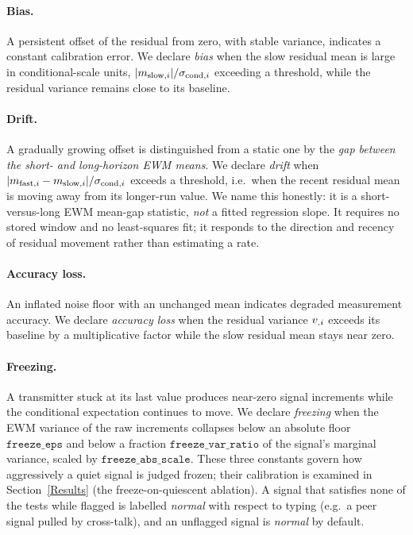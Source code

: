 \paragraph{Bias.} A persistent offset of the residual from zero, with stable variance, indicates a constant calibration error. We declare \emph{bias} when the slow residual mean is large in conditional-scale units, $|m _{\text{slow}, i}| / \sigma _{\text{cond}, i}$ exceeding a threshold, while the residual variance remains close to its baseline.

\paragraph{Drift.} A gradually growing offset is distinguished from a static one by the \emph{gap between the short- and long-horizon EWM means}. We declare \emph{drift} when $|m _{\text{fast}, i} - m _{\text{slow}, i}| / \sigma _{\text{cond}, i}$ exceeds a threshold, i.e.\ when the recent residual mean is moving away from its longer-run value. We name this honestly: it is a short-versus-long EWM mean-gap statistic, \emph{not} a fitted regression slope. It requires no stored window and no least-squares fit; it responds to the direction and recency of residual movement rather than estimating a rate.

\paragraph{Accuracy loss.} An inflated noise floor with an unchanged mean indicates degraded measurement accuracy. We declare \emph{accuracy loss} when the residual variance $v _{\text{}, i}$ exceeds its baseline by a multiplicative factor while the slow residual mean stays near zero.

\paragraph{Freezing.} A transmitter stuck at its last value produces near-zero signal increments while the conditional expectation continues to move. We declare \emph{freezing} when the EWM variance of the raw increments collapses below an absolute floor $\texttt{freeze\_eps}$ and below a fraction $\texttt{freeze\_var\_ratio}$ of the signal's marginal variance, scaled by $\texttt{freeze\_abs\_scale}$. These three constants govern how aggressively a quiet signal is judged frozen; their calibration is examined in Section~\ref{Results} (the freeze-on-quiescent ablation). A signal that satisfies none of the tests while flagged is labelled \emph{normal} with respect to typing (e.g.\ a peer signal pulled by cross-talk), and an unflagged signal is \emph{normal} by default.

